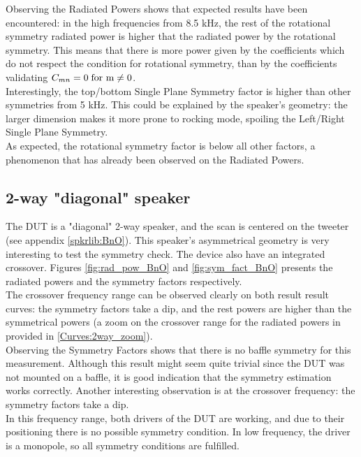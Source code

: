 \documentclass{report}
\begin{document}
Observing the Radiated Powers shows that expected results have been encountered: in the high frequencies from 8.5 kHz, the rest of the rotational symmetry radiated power is higher that the radiated power by the rotational symmetry. This means that there is more power given by the coefficients which do not respect the condition for rotational symmetry, than by the coefficients validating $C_{mn} = 0 \;  \textup{for m}  \neq 0$.  \\

Interestingly, the top/bottom Single Plane Symmetry factor is higher than other symmetries from 5 kHz. This could be explained by the speaker's geometry: the larger dimension makes it more prone to rocking mode, spoiling the Left/Right Single Plane Symmetry. \\
As expected, the rotational symmetry factor is below all other factors, a phenomenon that has already been observed on the Radiated Powers. \\



\subsection{2-way "diagonal" speaker}

The DUT is a "diagonal" 2-way speaker, and the scan is centered on the tweeter (see appendix \ref{spkrlib:BnO}). This speaker's asymmetrical geometry is very interesting to test the symmetry check. The device also have an integrated crossover. Figures \ref{fig:rad_pow_BnO} and \ref{fig:sym_fact_BnO} presents the radiated powers and the symmetry factors respectively. \\

The crossover frequency range can be observed clearly on both result result curves: the symmetry factors take a dip, and the rest powers are higher than the symmetrical powers (a zoom on the crossover range for the radiated powers in provided in \ref{Curves:2way_zoom}).\\

Observing the Symmetry Factors shows that there is no baffle symmetry for this measurement. Although this result might seem quite trivial since the DUT was not mounted on a baffle, it is good indication that the symmetry estimation works correctly. Another interesting observation is at the crossover frequency: the symmetry factors take a dip. \\
In this frequency range, both drivers of the DUT are working, and due to their positioning there is no possible symmetry condition. In low frequency, the driver is a monopole, so all symmetry conditions are fulfilled.\\
\end{document}
